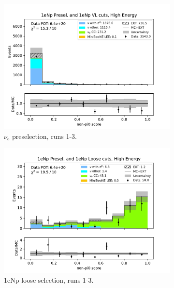 \begin{figure}[H]
    \centering
    \begin{subfigure}{0.33\linewidth}
    \includegraphics[width=\linewidth]{technote/Sidebands/Figures/FarSideband/far_sideband_nonpi0_score_run123_NP_NP_HIGH_ENERGY.pdf}
    \caption{$\nu_e$ preselection, runs 1-3.}
    \end{subfigure}%
    \begin{subfigure}{0.33\linewidth}
    \includegraphics[width=\linewidth]{technote/Sidebands/Figures/FarSideband/far_sideband_nonpi0_score_run123_NP_NPL_HIGH_ENERGY.pdf}
    \caption{1eNp loose selection, runs 1-3.}
    \end{subfigure}%
    \begin{subfigure}{0.33\linewidth}

\end{subfigure}
\end{figure}
